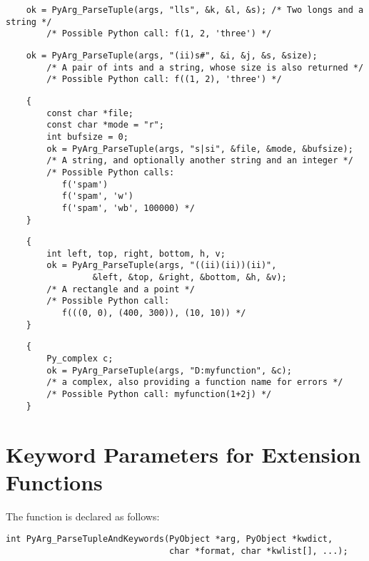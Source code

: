 \begin{verbatim}
    ok = PyArg_ParseTuple(args, "lls", &k, &l, &s); /* Two longs and a string */
        /* Possible Python call: f(1, 2, 'three') */
\end{verbatim}

\begin{verbatim}
    ok = PyArg_ParseTuple(args, "(ii)s#", &i, &j, &s, &size);
        /* A pair of ints and a string, whose size is also returned */
        /* Possible Python call: f((1, 2), 'three') */
\end{verbatim}

\begin{verbatim}
    {
        const char *file;
        const char *mode = "r";
        int bufsize = 0;
        ok = PyArg_ParseTuple(args, "s|si", &file, &mode, &bufsize);
        /* A string, and optionally another string and an integer */
        /* Possible Python calls:
           f('spam')
           f('spam', 'w')
           f('spam', 'wb', 100000) */
    }
\end{verbatim}

\begin{verbatim}
    {
        int left, top, right, bottom, h, v;
        ok = PyArg_ParseTuple(args, "((ii)(ii))(ii)",
                 &left, &top, &right, &bottom, &h, &v);
        /* A rectangle and a point */
        /* Possible Python call:
           f(((0, 0), (400, 300)), (10, 10)) */
    }
\end{verbatim}

\begin{verbatim}
    {
        Py_complex c;
        ok = PyArg_ParseTuple(args, "D:myfunction", &c);
        /* a complex, also providing a function name for errors */
        /* Possible Python call: myfunction(1+2j) */
    }
\end{verbatim}


\section{Keyword Parameters for Extension Functions
         \label{parseTupleAndKeywords}}


The  function is declared as
follows:

\begin{verbatim}
int PyArg_ParseTupleAndKeywords(PyObject *arg, PyObject *kwdict,
                                char *format, char *kwlist[], ...);
\end{verbatim}

